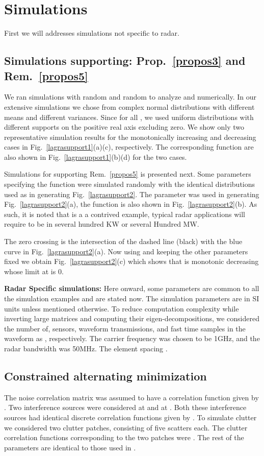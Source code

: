 \documentclass[11pt,draftclsnofoot,onecolumn]{IEEEtran}
\theoremstyle{definition}
\theoremstyle{remark}
\begin{document}
\section{Simulations}\label{sec:simulations}
First we will addresses simulations not specific to radar.

\subsection{Simulations supporting: Prop.~\ref{propos3} and Rem.~\ref{propos5}}

We ran simulations with random  and random  to analyze  and  numerically.   In our extensive simulations we chose  from complex normal distributions with different means and different variances. Since  for all , we used uniform distributions with different supports on the positive real axis excluding zero. We show only two representative simulation results for the monotonically increasing and decreasing cases in Fig.~\ref{lagrasupport1}(a)(c), respectively. The corresponding function  are also shown in Fig.~\ref{lagrasupport1}(b)(d) for the two cases. 

Simulations for supporting Rem.~\ref{propos5} is presented next. Some parameters specifying the function  were simulated randomly with the identical distributions used as in generating Fig.~\ref{lagrasupport2}. The parameter  was used in generating Fig.~\ref{lagrasupport2}(a), the function  is also shown in Fig.~\ref{lagrasupport2}(b). As such, it is noted that  is  a a contrived example, typical radar applications will require  to be in several hundred KW or several Hundred MW. 

The zero crossing is the intersection of the dashed line (black) with the blue curve in Fig.~\ref{lagrasupport2}(a). Now using  and keeping the other parameters fixed we obtain Fig.~\ref{lagrasupport2}(c) which shows that  is monotonic decreasing whose limit at  is 0. 


{\bf Radar Specific simulations:} Here onward, some  parameters are common to all the simulation examples and are stated now. The simulation parameters are in SI units  unless mentioned otherwise. To reduce computation complexity while inverting large matrices and computing their eigen-decompositions, we considered the number of, sensors, waveform transmissions, and fast time samples in the waveform as , respectively. The carrier frequency was chosen to be 1GHz, and the radar bandwidth was 50MHz. The element spacing . 
\subsection{Constrained alternating minimization}
The noise correlation matrix was assumed to have a correlation function given by . Two interference sources were considered at  and at . Both these interference sources had identical  discrete correlation functions given by . To simulate clutter we considered two clutter patches, consisting of five scatters each. The clutter correlation functions corresponding to the two patches were . The rest of the parameters are identical to those used in \cite{Setlurradar2013}. 
\end{document}

